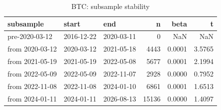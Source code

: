 \begin{table}
\caption{BTC: subsample stability}
\label{tab:t9_subsamples_BTC}
\begin{tabular}{lllrrr}
\toprule
subsample & start & end & n & beta & t \\
\midrule
pre-2020-03-12 & 2016-12-22 & 2020-03-11 & 0 & NaN & NaN \\
from 2020-03-12 & 2020-03-12 & 2021-05-18 & 4443 & 0.0001 & 3.5765 \\
from 2021-05-19 & 2021-05-19 & 2022-05-08 & 5677 & 0.0001 & 2.1994 \\
from 2022-05-09 & 2022-05-09 & 2022-11-07 & 2928 & 0.0000 & 0.7952 \\
from 2022-11-08 & 2022-11-08 & 2024-01-10 & 6861 & 0.0001 & 1.6513 \\
from 2024-01-11 & 2024-01-11 & 2026-08-13 & 15136 & 0.0000 & 1.4097 \\
\bottomrule
\end{tabular}
\end{table}
